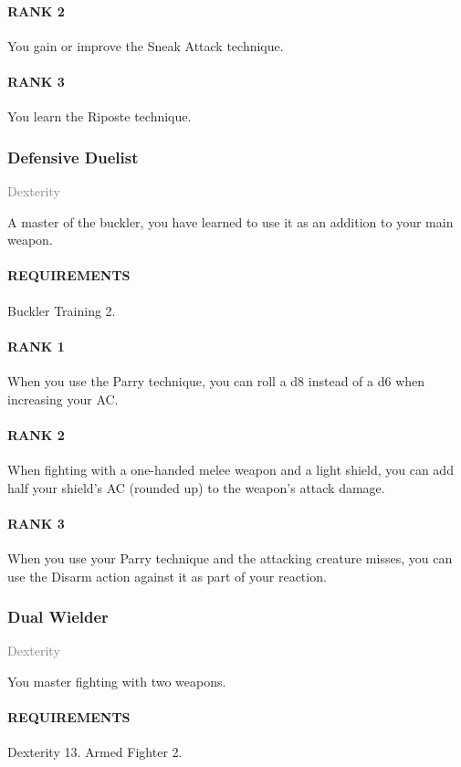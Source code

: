 \paragraph{RANK 2} You gain or improve the Sneak Attack technique.
\paragraph{RANK 3} You learn the Riposte technique.

\subsubsection{Defensive Duelist} \label{feat::defensiveduelist}
\small{\textcolor{gray}{Dexterity}}

\normalsize
A master of the buckler, you have learned to use it as an addition to your main weapon.
\paragraph{REQUIREMENTS} Buckler Training 2.
\paragraph{RANK 1} When you use the Parry technique, you can roll a d8 instead of a d6 when increasing your AC.
\paragraph{RANK 2} When fighting with a one-handed melee weapon and a light shield, you can add half your shield's AC (rounded up) to the weapon's attack damage.
\paragraph{RANK 3} When you use your Parry technique and the attacking creature misses, you can use the Disarm action against it as part of your reaction.

\subsubsection{Dual Wielder} \label{feat::dualwielder}
\small{\textcolor{gray}{Dexterity}}

\normalsize
You master fighting with two weapons.
\paragraph{REQUIREMENTS} Dexterity 13. Armed Fighter 2.
